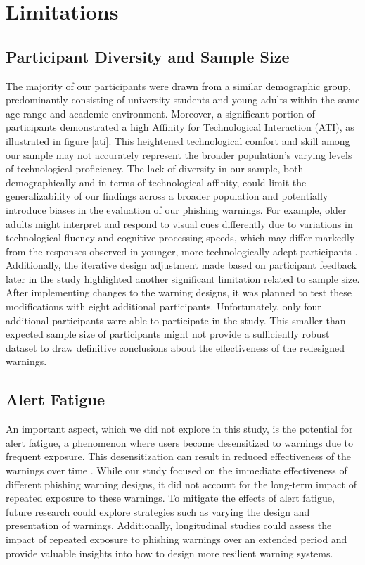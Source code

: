 \documentclass[
  a4paper,  %
  twoside,  %
  bibliography=totoc,
  headsepline,
  cleardoublepage=empty,
  parskip=half,
  draft=false
]{scrbook}
\begin{document}
\section{Limitations}

\subsection{Participant Diversity and Sample Size}
The majority of our participants were drawn from a similar demographic group, predominantly consisting of university students and young adults within the same age range and academic environment. Moreover, a significant portion of participants demonstrated a high Affinity for Technological Interaction (ATI), as illustrated in figure \ref{ati}. This heightened technological comfort and skill among our sample may not accurately represent the broader population's varying levels of technological proficiency. The lack of diversity in our sample, both demographically and in terms of technological affinity, could limit the generalizability of our findings across a broader population and potentially introduce biases in the evaluation of our phishing warnings. For example, older adults might interpret and respond to visual cues differently due to variations in technological fluency and cognitive processing speeds, which may differ markedly from the responses observed in younger, more technologically adept participants \cite{age}. \newline
Additionally, the iterative design adjustment made based on participant feedback later in the study highlighted another significant limitation related to sample size. After implementing changes to the warning designs, it was planned to test these modifications with eight additional participants. Unfortunately, only four additional participants were able to participate in the study. This smaller-than-expected sample size of participants might not provide a sufficiently robust dataset to draw definitive conclusions about the effectiveness of the redesigned warnings.

\subsection{Alert Fatigue}
An important aspect, which we did not explore in this study, is the potential for alert fatigue, a phenomenon where users become desensitized to warnings due to frequent exposure. This desensitization can result in reduced effectiveness of the warnings over time \cite{ban}. \newline While our study focused on the immediate effectiveness of different phishing warning designs, it did not account for the long-term impact of repeated exposure to these warnings. To mitigate the effects of alert fatigue, future research could explore strategies such as varying the design and presentation of warnings. Additionally, longitudinal studies could assess the impact of repeated exposure to phishing warnings over an extended period and provide valuable insights into how to design more resilient warning systems.
\end{document}

